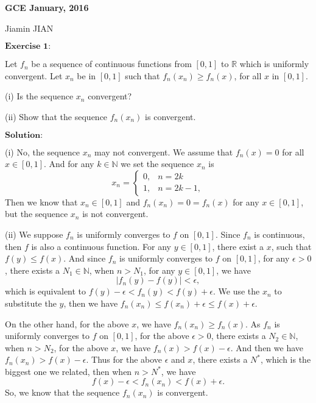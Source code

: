 \documentclass[12pt,a4paper]{ctexart}
\begin{document}
\begin{center}
\textbf{ GCE January, 2016}
\vspace{8pt}

Jiamin JIAN
\end{center}

\vspace{12pt}

$\textbf{Exercise 1:}$

Let $f_{n}$ be a sequence of continuous functions from $[0, 1]$ to $\mathbb{R}$ which is uniformly convergent. Let $x_{n}$ be in $[0, 1]$ such that $f_{n}(x_{n}) \geq f_{n}(x)$, for all $x$ in $[0, 1]$.

(i) Is the sequence $x_{n}$ convergent?

(ii) Show that the sequence $f_{n}(x_{n})$ is convergent.

\vspace{8pt}

$\textbf{Solution:}$

(i) No, the sequence $x_{n}$ may not convergent. We assume that $f_{n} (x) = 0$ for all $x \in [0, 1]$. And for any $k \in \mathbb{N}$ we set the sequence $x_{n}$ is
\begin{equation*}
x_{n} =
\left\{
             \begin{array}{cl}
             0, & n = 2k \\
             1, & n = 2k -1,
             \end{array}
\right.
\end{equation*}
Then we know that $x_{n} \in [0, 1]$ and $f_{n}(x_{n}) = 0 = f_{n}(x)$ for any $x \in [0, 1]$, but the sequence $x_{n}$ is not convergent.

(ii) We suppose $f_{n}$ is uniformly converges to $f$ on $[0, 1]$. Since $f_{n}$ is continuous, then $f$ is also a continuous function. For any $y \in [0, 1]$, there exist a $x$, such that $f(y) \leq f(x)$. And since $f_{n}$ is uniformly converges to $f$ on $[0, 1]$, for any $\epsilon > 0$, there exists a $N_{1} \in \mathbb{N}$, when $n > N_{1}$, for any $y \in [0, 1]$, we have
\begin{equation*}
    |f_{n}(y) - f(y)| < \epsilon,
\end{equation*}
which is equivalent to $f(y) - \epsilon < f_{n}(y) < f(y) + \epsilon$. We use the $x_{n}$ to substitute the $y$, then we have $f_{n}(x_{n}) \leq f(x_{n}) + \epsilon \leq f(x) + \epsilon$. 

On the other hand, for the above $x$, we have $f_{n}(x_{n}) \geq f_{n}(x)$. As $f_{n}$ is uniformly converges to $f$ on $[0, 1]$, for the above $\epsilon > 0$, there exists a $N_{2} \in \mathbb{N}$, when $n > N_{2}$, for the above $x$, we have $f_{n}(x) > f(x) - \epsilon$. And then we have $f_{n}(x_{n}) > f(x) - \epsilon$. Thus for the above $\epsilon$ and $x$, there exists a $N^{*}$, which is the biggest one we related, then when $n > N^{*}$, we have
\begin{equation*}
    f(x) - \epsilon < f_{n}(x_{n}) < f(x) + \epsilon .
\end{equation*}
So, we know that the sequence $f_{n}(x_{n})$ is convergent.
\end{document}

